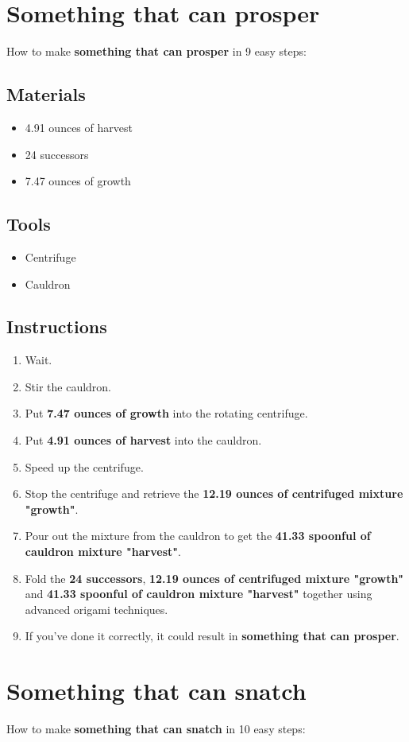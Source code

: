 \documentclass{article}
\begin{document}
\section{Something that can prosper}How to make \textbf{something that can prosper} in 9 easy steps:

\subsection{Materials}\begin{itemize}
\item 
4.91 ounces of harvest
\item 
24 successors
\item 
7.47 ounces of growth
\end{itemize}
\subsection{Tools}\begin{itemize}
\item 
Centrifuge
\item 
Cauldron
\end{itemize}
\subsection{Instructions}\begin{enumerate}
\item 
Wait.
\item 
Stir the cauldron.
\item 
Put \textbf{7.47 ounces of growth} into the rotating centrifuge.
\item 
Put \textbf{4.91 ounces of harvest} into the cauldron.
\item 
Speed up the centrifuge.
\item 
Stop the centrifuge and retrieve the \textbf{12.19 ounces of centrifuged mixture "growth"}.
\item 
Pour out the mixture from the cauldron to get the \textbf{41.33 spoonful of cauldron mixture "harvest"}.
\item 
Fold the \textbf{24 successors}, \textbf{12.19 ounces of centrifuged mixture "growth"} and \textbf{41.33 spoonful of cauldron mixture "harvest"} together using advanced origami techniques.
\item 
If you've done it correctly, it could result in \textbf{something that can prosper}.
\end{enumerate}
\newpage
\section{Something that can snatch}How to make \textbf{something that can snatch} in 10 easy steps:
\end{document}
